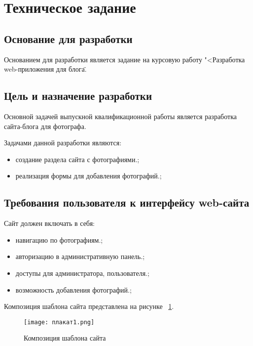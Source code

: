 \section{Техническое задание}
\subsection{Основание для разработки}

Основанием для разработки является задание на курсовую работу "<Разработка web-приложения \textquotedbl для блога\textquotedbl\".

\subsection{Цель и назначение разработки}

Основной задачей выпускной квалификационной работы является 
разработка сайта-блога для фотографа.

Задачами данной разработки являются:
\begin{itemize}
\item создание раздела сайта с фотографиями.;
\item реализация формы для добавления фотографий.;
\end{itemize}

\subsection{Требования пользователя к интерфейсу web-сайта}

Сайт должен включать в себя:
\begin{itemize}
    \item навигацию по фотографиям.;
    \item авторизацию в административную панель.;
    \item доступы для администратора, пользователя.;
    \item возможность добавления фотографий.;
\end{itemize}

Композиция шаблона сайта представлена на рисунке ~\ref{maket:image}.

\begin{figure}[ht]
\texttt{[image: плакат1.png]}
\caption{Композиция шаблона сайта}
\label{maket:image}
\end{figure}

